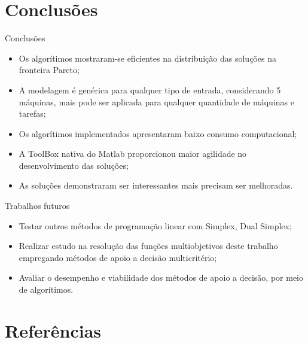 \documentclass[]{beamer}
\begin{document}
\section{Conclusões}
\begin{frame}{Conclusões}
	\begin{itemize}
		\item Os algorítimos mostraram-se eficientes na distribuição das soluções na fronteira Pareto;
        \item A modelagem é genérica para qualquer tipo de entrada, considerando 5 máquinas, mais pode
        ser aplicada para qualquer quantidade de máquinas e tarefas;
		\item Os algorítimos implementados apresentaram baixo consumo computacional;
        \item A ToolBox nativa do Matlab proporcionou maior agilidade no desenvolvimento das soluções;
        \item As soluções demonstraram ser interessantes mais precisam ser melhoradas.
        	
	\end{itemize}
\end{frame}

\begin{frame}{Trabalhos futuros}
	\begin{itemize}
		\item Testar outros métodos de programação linear com Simplex, Dual Simplex;
		\item Realizar estudo na resolução das funções multiobjetivos deste trabalho empregando
		métodos de apoio a decisão multicritério;
		\item Avaliar o desempenho e viabilidade dos métodos de apoio a decisão, por meio de algorítimos.	
	\end{itemize}
\end{frame}
\section{Referências}

%
%

\end{document}
